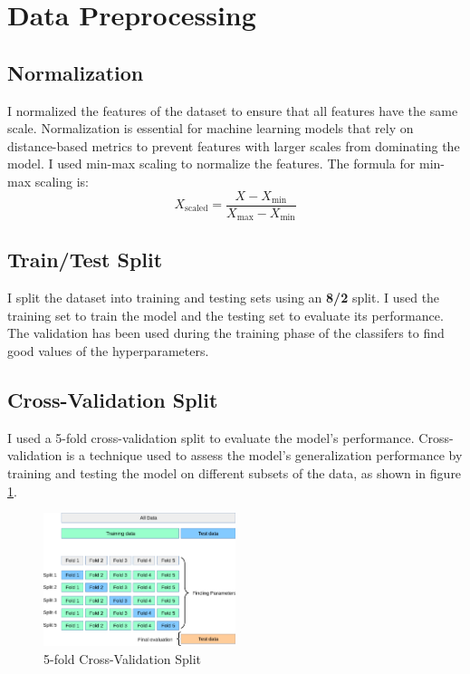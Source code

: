 \documentclass[11.5pt]{article}
\begin{document}
\pagebreak

\section{Data Preprocessing} \label{sec:data_preprocessing}
\subsection{Normalization}
I normalized the features of the dataset to ensure that all features have the same scale. Normalization is essential for machine learning models that rely on distance-based metrics to prevent features with larger scales from dominating the model. I used min-max scaling to normalize the features. The formula for min-max scaling is:
\begin{equation}
    X_{\text{scaled}} = \frac{X - X_{\text{min}}}{X_{\text{max}} - X_{\text{min}}}
\end{equation}

\subsection{Train/Test Split} \label{sec:train_test_split}
I split the dataset into training and testing sets using an \textbf{8/2} split. I used the training set to train the model and the testing set to evaluate its performance. The validation has been used during the training phase of the classifers to find good values of the hyperparameters.

\subsection{Cross-Validation Split} \label{sec:cross_validation_split}
I used a 5-fold cross-validation split to evaluate the model's performance. Cross-validation is a technique used to assess the model's generalization performance by training and testing the model on different subsets of the data, as shown in figure \ref{fig:cross_validation}.
\begin{figure}[H]
    \centering
    \includegraphics[width=0.5\textwidth]{graphics/grid_search_cross_validation.png}
    \caption{5-fold Cross-Validation Split\cite{31CrossvalidationEvaluating}}
    \label{fig:cross_validation}
\end{figure}
\end{document}
